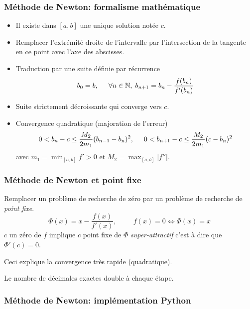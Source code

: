 \begin{frame}
  \frametitle{Méthode de Newton: formalisme mathématique}
\begin{itemize}
  \item Il existe dans $[a,b]$ une unique solution notée $c$.
  \item Remplacer l'extrémité droite de l'intervalle par l'intersection de la tangente en ce point avec l'axe des abscisses.
  \item Traduction par une suite définie par récurrence
\begin{displaymath}
  b_0 = b,\hspace{0.5cm}\forall n\in\mathbb{N},\;b_{n+1} = b_n -\frac{f(b_n)}{f'(b_n)}
\end{displaymath}
  \item Suite strictement décroissante qui converge vers $c$.
  \item Convergence quadratique (majoration de l'erreur)
\begin{displaymath}
  0< b_n -c \leq \frac{M_2}{2m_1}(b_{n-1}-b_n)^2,\hspace{0.5cm} 0< b_{n+1} -c \leq \frac{M_2}{2m_1}(c-b_n)^2
\end{displaymath}
avec $m_1 = \min_{[a,b]} f'>0$ et $M_2 = \max_{[a,b]}\left|f''\right|$.
\end{itemize}
\end{frame}

\begin{frame}
  \frametitle{Méthode de Newton et point fixe}
Remplacer un problème de recherche de zéro par un problème de recherche de \emph{point fixe}.
\begin{displaymath}
  \Phi(x) = x -\frac{f(x)}{f'(x)}, \hspace{1cm} f(x) = 0 \Leftrightarrow \Phi(x) = x
\end{displaymath}
$c$ un zéro de $f$ implique $c$ point fixe de $\Phi$ \emph{super-attractif} c'est à dire que $\Phi'(c)=0$.

Ceci explique la convergence très rapide (quadratique).

Le nombre de décimales exactes double à chaque étape.
\end{frame}

\begin{frame}
  \frametitle{Méthode de Newton: implémentation Python}

\end{frame}


